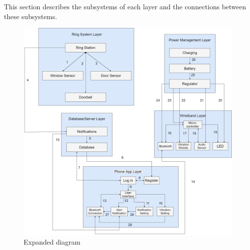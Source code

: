 This section describes the subsystems of each layer and the connections between these subsystems.

\begin{figure}[h!]
	\centering
 	\includegraphics[width=\textwidth]{images/overall_ADS.drawio (1).png}
 \caption{Expanded diagram}
\end{figure}
